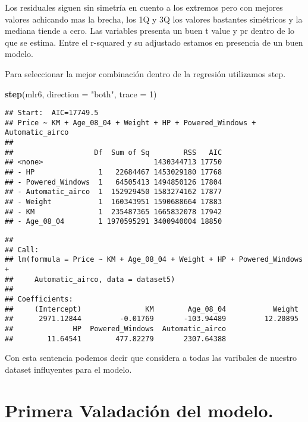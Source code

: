 \documentclass[
]{article}
\newenvironment{Shaded}{\begin{snugshade}}{\end{snugshade}}
\newcommand{\DataTypeTok}[1]{\textcolor[rgb]{0.13,0.29,0.53}{#1}}
\newcommand{\DecValTok}[1]{\textcolor[rgb]{0.00,0.00,0.81}{#1}}
\newcommand{\KeywordTok}[1]{\textcolor[rgb]{0.13,0.29,0.53}{\textbf{#1}}}
\newcommand{\NormalTok}[1]{#1}
\newcommand{\StringTok}[1]{\textcolor[rgb]{0.31,0.60,0.02}{#1}}
\begin{document}
Los residuales siguen sin simetría en cuento a los extremos pero con
mejores valores achicando mas la brecha, los 1Q y 3Q los valores
bastantes simétricos y la mediana tiende a cero. Las variables presenta
un buen t value y pr dentro de lo que se estima. Entre el r-squared y su
adjustado estamos en presencia de un buen modelo.

Para seleccionar la mejor combinación dentro de la regresión utilizamos
step.

\begin{Shaded}
\begin{Highlighting}[]
\KeywordTok{step}\NormalTok{(mlr6, }\DataTypeTok{direction =} \StringTok{"both"}\NormalTok{, }\DataTypeTok{trace =} \DecValTok{1}\NormalTok{)}
\end{Highlighting}
\end{Shaded}

\begin{verbatim}
## Start:  AIC=17749.5
## Price ~ KM + Age_08_04 + Weight + HP + Powered_Windows + Automatic_airco
## 
##                   Df  Sum of Sq        RSS   AIC
## <none>                          1430344713 17750
## - HP               1   22684467 1453029180 17768
## - Powered_Windows  1   64505413 1494850126 17804
## - Automatic_airco  1  152929450 1583274162 17877
## - Weight           1  160343951 1590688664 17883
## - KM               1  235487365 1665832078 17942
## - Age_08_04        1 1970595291 3400940004 18850
\end{verbatim}

\begin{verbatim}
## 
## Call:
## lm(formula = Price ~ KM + Age_08_04 + Weight + HP + Powered_Windows + 
##     Automatic_airco, data = dataset5)
## 
## Coefficients:
##     (Intercept)               KM        Age_08_04           Weight  
##      2971.12844         -0.01769       -103.94489         12.20895  
##              HP  Powered_Windows  Automatic_airco  
##        11.64541        477.82279       2307.64388
\end{verbatim}

Con esta sentencia podemos decir que considera a todas las varibales de
nuestro dataset influyentes para el modelo.

\hypertarget{primera-valadaciuxf3n-del-modelo.}{%
\section{Primera Valadación del
modelo.}\label{primera-valadaciuxf3n-del-modelo.}}
\end{document}
